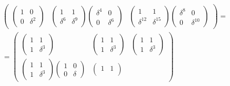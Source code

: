 \begin{multline*}
\begin{pmatrix}
\begin{pmatrix}
            1 & 0        \\
            0 & \delta^2
        \end{pmatrix}
        &
        \begin{pmatrix}
            1        & 1        \\
            \delta^6 & \delta^9
        \end{pmatrix}
        \begin{pmatrix}
            \delta^4 & 0        \\
            0        & \delta^6
        \end{pmatrix}
        &
        \begin{pmatrix}
            1           & 1           \\
            \delta^{12} & \delta^{15}
        \end{pmatrix}
        \begin{pmatrix}
            \delta^8 & 0           \\
            0        & \delta^{10}
        \end{pmatrix}
    \end{pmatrix} = \\
    =
    \begin{pmatrix}
        \begin{pmatrix}
            1 & 1        \\
            1 & \delta^3
        \end{pmatrix}
        &
        \begin{pmatrix}
            1 & 1        \\
            1 & \delta^3
        \end{pmatrix}
        &
        \begin{pmatrix}
            1 & 1        \\
            1 & \delta^3
        \end{pmatrix}
        \\
        \begin{pmatrix}
            1 & 1        \\
            1 & \delta^3
        \end{pmatrix}
        \begin{pmatrix}
            1 & 0      \\
            0 & \delta
        \end{pmatrix}
        &
        \begin{pmatrix}
            1 & 1        \\

\end{pmatrix}
\end{pmatrix}
\end{multline*}
